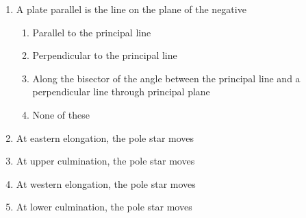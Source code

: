 \documentclass[11pt,a4paper]{article}
\begin{document}
\begin{enumerate}
\item{A plate parallel is the line on the plane of the negative}
\begin{enumerate}[label=\Alph*.]
\item{Parallel to the principal line}
\item{Perpendicular to the principal line}
\item{Along the bisector of the angle between the principal line and a perpendicular line through principal plane}
\item{None of these}
\end{enumerate}
\item{At eastern elongation, the pole star moves}
\\
\item{At upper culmination, the pole star moves}
\\
\item{At western elongation, the pole star moves}
\\
\item{At lower culmination, the pole star moves}
\\

\end{enumerate}
\end{document}
